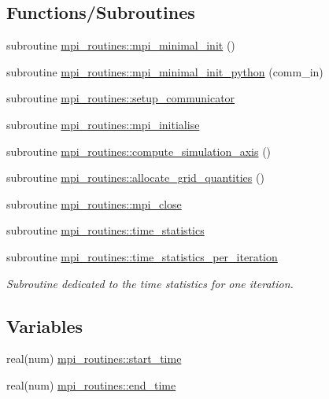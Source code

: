\subsection*{Functions/\+Subroutines}
\begin{DoxyCompactItemize}
\item 
subroutine \hyperlink{namespacempi__routines_a61438ec53719149e70d0600171070933}{mpi\+\_\+routines\+::mpi\+\_\+minimal\+\_\+init} ()
\item 
subroutine \hyperlink{namespacempi__routines_a207f6d765479d24553ae1186200a5d9d}{mpi\+\_\+routines\+::mpi\+\_\+minimal\+\_\+init\+\_\+python} (comm\+\_\+in)
\item 
subroutine \hyperlink{namespacempi__routines_a32b858516b2e2b02580cf4ce8cb40ccc}{mpi\+\_\+routines\+::setup\+\_\+communicator}
\item 
subroutine \hyperlink{namespacempi__routines_a2574986e9474b6d4144f099df814e257}{mpi\+\_\+routines\+::mpi\+\_\+initialise}
\item 
subroutine \hyperlink{namespacempi__routines_ac6bf7d666673e87855069981a4a664d5}{mpi\+\_\+routines\+::compute\+\_\+simulation\+\_\+axis} ()
\item 
subroutine \hyperlink{namespacempi__routines_a483f086b039961c1b48127fc9d81cf65}{mpi\+\_\+routines\+::allocate\+\_\+grid\+\_\+quantities} ()
\item 
subroutine \hyperlink{namespacempi__routines_ab1a2d976a5017905d06e301f5af07ad2}{mpi\+\_\+routines\+::mpi\+\_\+close}
\item 
subroutine \hyperlink{namespacempi__routines_a39928834ab9f9c980ffc2e7849cf8af3}{mpi\+\_\+routines\+::time\+\_\+statistics}
\item 
subroutine \hyperlink{namespacempi__routines_aae81751f0f074a5eba4ddc0126bfd5cd}{mpi\+\_\+routines\+::time\+\_\+statistics\+\_\+per\+\_\+iteration}
\begin{DoxyCompactList}\small\item\em Subroutine dedicated to the time statistics for one iteration. \end{DoxyCompactList}\end{DoxyCompactItemize}
\subsection*{Variables}
\begin{DoxyCompactItemize}
\item 
real(num) \hyperlink{namespacempi__routines_aa3f567f6443fe088b81d3fb43509a45c}{mpi\+\_\+routines\+::start\+\_\+time}
\item 
real(num) \hyperlink{namespacempi__routines_a4b0b516f93006e24d942b3f124cb82d4}{mpi\+\_\+routines\+::end\+\_\+time}
\end{DoxyCompactItemize}

